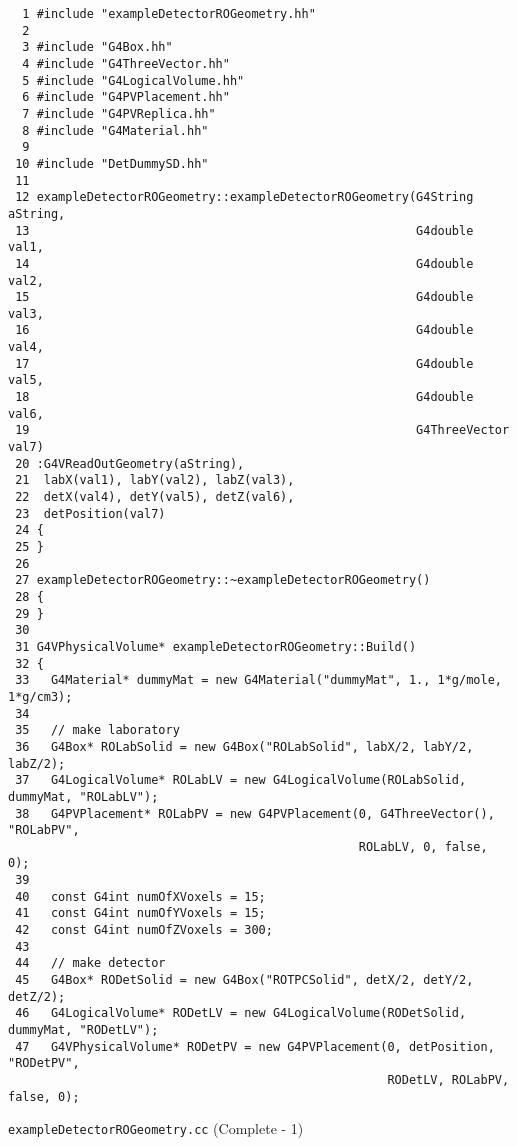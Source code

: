 \begin{code}[p]
\begin{lstlisting}
  1 #include "exampleDetectorROGeometry.hh"
  2 
  3 #include "G4Box.hh"
  4 #include "G4ThreeVector.hh"
  5 #include "G4LogicalVolume.hh"
  6 #include "G4PVPlacement.hh"
  7 #include "G4PVReplica.hh"
  8 #include "G4Material.hh"
  9 
 10 #include "DetDummySD.hh"
 11 
 12 exampleDetectorROGeometry::exampleDetectorROGeometry(G4String aString,
 13                                                      G4double val1,
 14                                                      G4double val2,
 15                                                      G4double val3,
 16                                                      G4double val4,
 17                                                      G4double val5,
 18                                                      G4double val6,
 19                                                      G4ThreeVector val7)
 20 :G4VReadOutGeometry(aString),
 21  labX(val1), labY(val2), labZ(val3),
 22  detX(val4), detY(val5), detZ(val6),
 23  detPosition(val7)
 24 {
 25 }
 26 
 27 exampleDetectorROGeometry::~exampleDetectorROGeometry()
 28 {
 29 }
 30 
 31 G4VPhysicalVolume* exampleDetectorROGeometry::Build()
 32 {
 33   G4Material* dummyMat = new G4Material("dummyMat", 1., 1*g/mole, 1*g/cm3);
 34 
 35   // make laboratory
 36   G4Box* ROLabSolid = new G4Box("ROLabSolid", labX/2, labY/2, labZ/2);
 37   G4LogicalVolume* ROLabLV = new G4LogicalVolume(ROLabSolid, dummyMat, "ROLabLV");
 38   G4PVPlacement* ROLabPV = new G4PVPlacement(0, G4ThreeVector(), "ROLabPV",
                                                 ROLabLV, 0, false, 0);
 39 
 40   const G4int numOfXVoxels = 15;
 41   const G4int numOfYVoxels = 15;
 42   const G4int numOfZVoxels = 300;
 43 
 44   // make detector
 45   G4Box* RODetSolid = new G4Box("ROTPCSolid", detX/2, detY/2, detZ/2);
 46   G4LogicalVolume* RODetLV = new G4LogicalVolume(RODetSolid, dummyMat, "RODetLV");
 47   G4VPhysicalVolume* RODetPV = new G4PVPlacement(0, detPosition, "RODetPV",
                                                     RODetLV, ROLabPV, false, 0);
\end{lstlisting}
\caption{\texttt{exampleDetectorROGeometry.cc} (Complete - 1) \label{code-4-4}}
\end{code}

